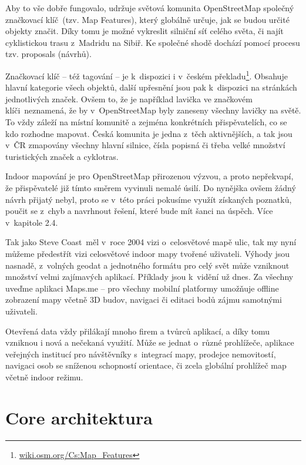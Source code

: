 Aby to vše dobře fungovalo, udržuje světová komunita OpenStreetMap společný značkovací klíč~(tzv. Map Features), který globálně určuje, jak se budou určité objekty značit. Díky tomu je možné vykreslit silniční síť celého světa, či najít cyklistickou trasu z~Madridu na Sibiř. Ke společné shodě dochází pomocí procesu tzv. proposals (návrhů).

Značkovací klíč -- též tagování -- je k~dispozici i v~českém překladu\footnote{\href{http://wiki.osm.org/Cs:Map\_Features}{wiki.osm.org/Cs:Map\_Features}}. Obsahuje hlavní kategorie všech objektů, další upřesnění jsou pak k~dispozici na stránkách jednotlivých značek. Ovšem to, že je například lavička ve značkovém klíči~neznamená, že by v~OpenStreetMap byly zaneseny všechny lavičky na světě. To vždy záleží na místní komunitě a zejména konkrétních přispěvatelích, co se kdo rozhodne mapovat. Česká komunita je jedna z~těch aktivnějších, a tak jsou v~ČR zmapovány všechny hlavní silnice, čísla popisná či třeba velké množství turistických značek a cyklotras.\cite{zdroj40}

Indoor mapování je pro OpenStreetMap přirozenou výzvou, a proto nepřekvapí, že přispěvatelé již tímto směrem vyvinuli nemalé úsilí. Do nynějška ovšem žádný návrh přijatý nebyl, proto se v~této práci pokusíme využít získaných poznatků, poučit se z~chyb a navrhnout řešení, které bude mít šanci na úspěch. Více v~kapitole 2.4.

Tak jako Steve Coast~měl v~roce 2004 vizi o~celosvětové mapě ulic, tak my nyní můžeme předestřít vizi celosvětové indoor mapy tvořené uživateli. Výhody jsou nasnadě, z~volných geodat a jednotného formátu pro celý svět může vzniknout množství velmi zajímavých aplikací. Příklady jsou k~vidění už dnes. Za všechny uveďme aplikaci Maps.me -- pro všechny mobilní platformy umožňuje offline zobrazení mapy včetně 3D budov, navigaci či editaci bodů zájmu samotnými uživateli.

Otevřená data vždy přilákají mnoho firem a tvůrců aplikací, a díky tomu vzniknou i nová a nečekaná využití. Může se jednat o~různé prohlížeče, aplikace veřejných institucí pro návštěvníky s~integrací mapy, prodejce nemovitostí, navigaci osob se sníženou schopností orientace, či zcela globální prohlížeč map včetně indoor režimu.

\section{Core architektura}\label{core-architektura}

